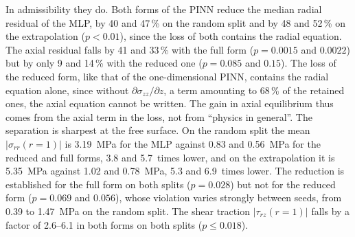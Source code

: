 In admissibility they do. Both forms of the PINN reduce the median radial residual of the MLP, by 40 and 47\,\% on the random split and by 48 and 52\,\% on the extrapolation ($p<0.01$), since the loss of both contains the radial equation. The axial residual falls by 41 and 33\,\% with the full form ($p=0.0015$ and $0.0022$) but by only 9 and 14\,\% with the reduced one ($p=0.085$ and $0.15$). The loss of the reduced form, like that of the one-dimensional PINN, contains the radial equation alone, since without $\partial\sigma_{zz}/\partial z$, a term amounting to 68\,\% of the retained ones, the axial equation cannot be written. The gain in axial equilibrium thus comes from the axial term in the loss, not from ``physics in general''. The separation is sharpest at the free surface. On the random split the mean $|\sigma_{rr}(r{=}1)|$ is 3.19~MPa for the MLP against 0.83 and 0.56~MPa for the reduced and full forms, 3.8 and 5.7~times lower, and on the extrapolation it is 5.35~MPa against 1.02 and 0.78~MPa, 5.3 and 6.9~times lower. The reduction is established for the full form on both splits ($p=0.028$) but not for the reduced form ($p=0.069$ and $0.056$), whose violation varies strongly between seeds, from 0.39 to 1.47~MPa on the random split. The shear traction $|\tau_{rz}(r{=}1)|$ falls by a factor of 2.6--6.1 in both forms on both splits ($p\le0.018$).

